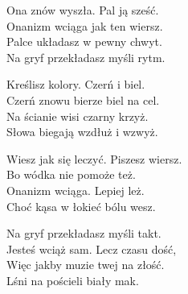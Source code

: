 \begin{text}
    Ona znów wyszła. Pal ją sześć.\\
    Onanizm wciąga jak ten wiersz.\\
    Palce układasz w pewny chwyt.\\
    Na gryf przekładasz myśli rytm.

    Kreślisz kolory. Czerń i biel.\\
    Czerń znowu bierze biel na cel.\\
    Na ścianie wisi czarny krzyż.\\
    Słowa biegają wzdłuż i wzwyż.

    Wiesz jak się leczyć. Piszesz wiersz.\\
    Bo wódka nie pomoże też.\\
    Onanizm wciąga. Lepiej leż.\\
    Choć kąsa w łokieć bólu wesz.

    Na gryf przekładasz myśli takt.\\
    Jesteś wciąż sam. Lecz czasu dość,\\
    Więc jakby muzie twej na złość.\\
    Lśni na pościeli biały mak.
\end{text}
\begin{chord}

\end{chord}